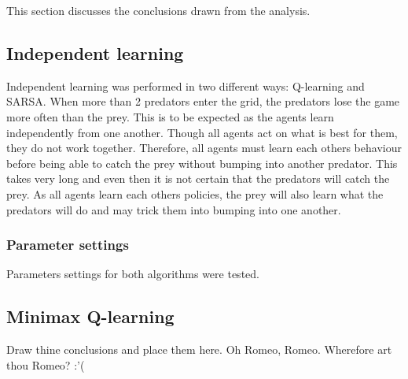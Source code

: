 This section discusses the conclusions drawn from the analysis. %

\subsection{Independent learning}
Independent learning was performed in two different ways: Q-learning and SARSA. When more than 2 predators enter the grid, the predators lose the game more often than the prey. This is to be expected as the agents learn independently from one another. Though all agents act on what is best for them, they do not work together. Therefore, all agents must learn each others behaviour before being able to catch the prey without bumping into another predator. This takes very long and even then it is not certain that the predators will catch the prey. As all agents learn each others policies, the prey will also learn what the predators will do and may trick them into bumping into one another.

\subsubsection{Parameter settings}
Parameters settings for both algorithms were tested. 

\subsection{Minimax Q-learning}
Draw thine conclusions and place them here. Oh Romeo, Romeo. Wherefore art thou Romeo? :'(